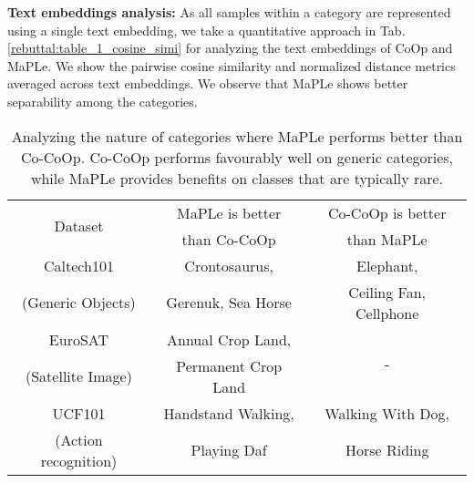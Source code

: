 \documentclass[10pt,twocolumn,letterpaper]{article}
\newcommand{\tablestyle}[2]{\setlength{\tabcolsep}{#1}\renewcommand{\arraystretch}{#2}\centering\footnotesize}
\begin{document}
\textbf{Text embeddings analysis:} As all samples within a category are represented using a single text embedding, we take a quantitative approach in Tab. \ref{rebuttal:table_1_cosine_simi} for analyzing the text embeddings of CoOp and MaPLe. We show the pairwise cosine similarity and normalized  distance metrics averaged across text embeddings. We observe that MaPLe shows better separability among the categories.

\begin{table}[t]
\setlength{\tabcolsep}{3pt}
\centering
{}\hspace{-0.9em}
\caption{\small Avg. cosine similarity and  distance of text embeddings. MaPLe shows better separability among the text categories.}
\label{rebuttal:table_1_cosine_simi}
\end{table}



\begin{table}[ht]
\tablestyle{8pt}{1.1}
\addtolength{\tabcolsep}{-3.7pt}
\centering
\begin{tabular}{ccc}
\toprule
\multirow{2}{*}{Dataset} & {MaPLe is better}  & {Co-CoOp is better} \\
  & {than  Co-CoOp}  & {than MaPLe} \\
\midrule
Caltech101 & Crontosaurus, & Elephant,\\
(Generic Objects) & Gerenuk, Sea Horse & Ceiling Fan, Cellphone \\
\midrule
EuroSAT & Annual Crop Land, & \multirow{2}{*}{-}\\
(Satellite Image) & Permanent Crop Land &		\\
\midrule
UCF101 & Handstand Walking, & Walking With Dog,\\
(Action recognition) & Playing Daf & Horse Riding	\\
\bottomrule
\end{tabular}
\caption{ 
Analyzing the nature of categories where MaPLe performs better than Co-CoOp. Co-CoOp performs favourably well on generic categories, while MaPLe provides benefits on classes that are typically rare.
} 
\label{table:class_category_analysis}
\end{table}
\end{document}
